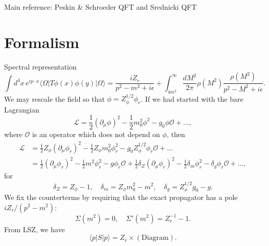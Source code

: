 \documentclass[11pt]{article}
\renewcommand\bra[1]{{\langle{#1}|}}
\renewcommand\ket[1]{{|{#1}\rangle}}
\theoremstyle{definition}
\theoremstyle{remark}
\begin{document}
	Main reference: Peskin \& Schroeder QFT and Srednicki QFT
	\section{Formalism}
	Spectral representation
	\[\int d^{4}x\,e^{ip\cdot x}\bra{\Omega}T\phi(x)\phi(y)\ket{\Omega}=\frac{iZ_{r}}{p^{2}-m^{2}+i\epsilon}+\int_{4m^{2}}^{\infty}\frac{dM^{2}}{2\pi}\rho(M^{2})\frac{\rho(M^{2})}{p^{2}-M^{2}+i\epsilon}.\]
	We may rescale the field so that $\phi=Z_{\phi}^{1/2}\phi_{r}$.
	If we had started with the bare Lagrangian
	\[\mathcal{L}=\frac{1}{2}(\partial_{\mu}\phi)^{2}-\frac{1}{2}m_{0}^{2}\phi^{2}-g_{0}\phi\mathcal{O}+\dots,\]
	where $\mathcal{O}$ is an operator which does not depend on $\phi$, then
	\begin{align*}
		\mathcal{L}&=\frac{1}{2}Z_{\phi}(\partial_{\mu}\phi_{r})^{2}-\frac{1}{2}Z_{\phi}m_{0}^{2}\phi_{r}^{2}-g_{0}Z_{\phi}^{1/2}\phi_{r}\mathcal{O}+\dots\\
		&=\frac{1}{2}(\partial_{\mu}\phi_{r})^{2}-\frac{1}{2}m^{2}\phi_{r}^{2}-g\phi_{r}\mathcal{O}+\frac{1}{2}\delta_{Z}(\partial_{\mu}\phi_{r})^{2}-\frac{1}{2}\delta_{m}\phi_{r}^{2}-\delta_{g}\phi_{r}\mathcal{O}+\dots,
	\end{align*}
	for
	\[\delta_{Z}=Z_{\phi}-1,\quad\delta_{m}=Z_{\phi}m_{0}^{2}-m^{2},\quad\delta_{g}=Z_{\phi}^{1/2}g_{0}-g.\]
	We fix the counterterms by requiring that the exact propagator has a pole $iZ_{r}/(p^{2}-m^{2})$:
	\[\Sigma(m^{2})=0,\quad\Sigma'(m^{2})=Z_{r}^{-1}-1.\]
	From LSZ, we have
	\[\bra{p}S\ket{p}=Z_{r}\times(\text{Diagram}).\]
	
\end{document}
